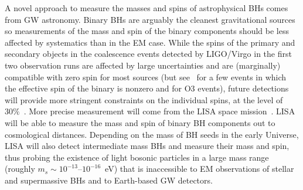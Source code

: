 \documentclass[11pt]{article}
\numberwithin{equation}{section} %
\begin{document}
A novel approach to measure the masses and spins of astrophysical BHs comes from GW astronomy. Binary BHs are arguably the cleanest gravitational sources so measurements of the mass and spin of the binary components should be less affected by systematics than in the EM case.
%
While the spins of the primary and secondary objects in the coalescence events detected by LIGO/Virgo in the first two 
observation runs are affected by large uncertainties and are (marginally) compatible with zero spin for most sources 
(but see~\cite{LIGOScientific:2018mvr,Venumadhav:2019lyq} for a few events in which the effective spin of the binary is 
nonzero and \cite{Abbott:2020niy} for O3 events), future detections will provide more stringent constraints on the 
individual spins, at the level of $30\%$~\cite{TheLIGOScientific:2016pea}.
%
More precise measurement will come from the LISA space mission~\cite{Audley:2017drz}. LISA will be able to measure the mass and spin of binary BH components out to cosmological distances. Depending on the mass of BH seeds in the early Universe, LISA will also detect intermediate mass BHs and measure their mass and spin, thus probing the existence of
light bosonic particles in a large mass range (roughly $m_s\sim 10^{-13}$--$10^{-16}$~eV) that is inaccessible to EM observations of stellar and supermassive BHs and to Earth-based GW detectors.
%





%
\end{document}
